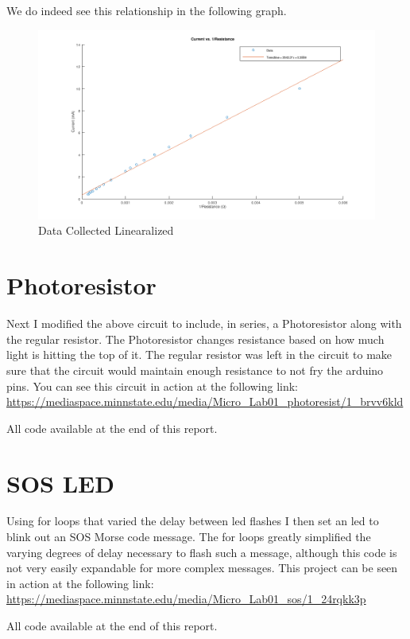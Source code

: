 \documentclass[prb,preprint]{revtex4-1}
\begin{document}
We do indeed see this relationship in the following graph.

\begin{figure}[ht]
	\centering
	\includegraphics[width=6in]{bigGraph2.png}
	\caption{Data Collected Linearalized}
	\label{fig1}
\end{figure}


\section{Photoresistor}

Next I modified the above circuit to include, in series, a Photoresistor along with the regular resistor. The Photoresistor changes resistance based on how much light is hitting the top of it. The regular resistor was left in the circuit to make sure that the circuit would maintain enough resistance to not fry the arduino pins. You can see this circuit in action at the following link: \url{https://mediaspace.minnstate.edu/media/Micro_Lab01_photoresist/1_brvv6kld}

All code available at the end of this report.

\section{SOS LED}

Using for loops that varied the delay between led flashes I then set an led to blink out an SOS Morse code message. The for loops greatly simplified the varying degrees of delay necessary to flash such a message, although this code is not very easily expandable for more complex messages. This project can be seen in action at the following link: \url{https://mediaspace.minnstate.edu/media/Micro_Lab01_sos/1_24rqkk3p}


All code available at the end of this report.
\end{document}
